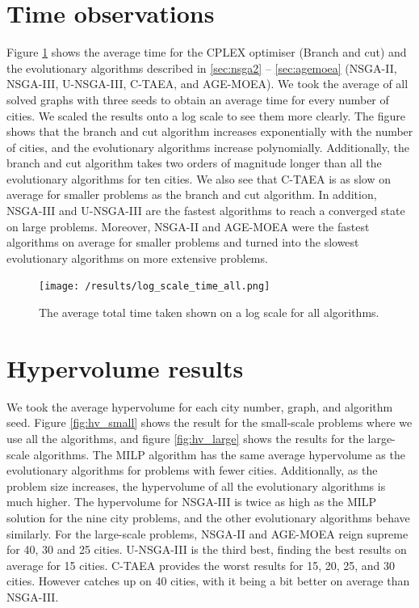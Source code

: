 \documentclass[mscthesis, 11pt]{usiinfthesis}
\theoremstyle{newdefinition}
\begin{document}
\section{Time observations}\label{sec:time_res}
Figure \ref{fig:log_time} shows the average time for the CPLEX optimiser (Branch and cut) and the evolutionary algorithms described in \ref{sec:nsga2} -- \ref{sec:agemoea} (NSGA-II, NSGA-III, U-NSGA-III, C-TAEA, and AGE-MOEA). We took the average of all solved graphs with three seeds to obtain an average time for every number of cities. We scaled the results onto a log scale to see them more clearly. The figure shows that the branch and cut algorithm increases exponentially with the number of cities, and the evolutionary algorithms increase polynomially. Additionally, the branch and cut algorithm takes two orders of magnitude longer than all the evolutionary algorithms for ten cities.  We also see that C-TAEA is as slow on average for smaller problems as the branch and cut algorithm. In addition, NSGA-III and U-NSGA-III are the fastest algorithms to reach a converged state on large problems. Moreover, NSGA-II and AGE-MOEA were the fastest algorithms on average for smaller problems and turned into the slowest evolutionary algorithms on more extensive problems.
\begin{figure}[ht]
    \centering
    \texttt{[image: /results/log\_scale\_time\_all.png]}
    \caption{The average total time taken shown on a log scale for all algorithms.}
    \label{fig:log_time}
\end{figure}
\clearpage
\section{Hypervolume results}\label{sec:hv_res}
We took the average hypervolume for each city number, graph, and algorithm seed. Figure \ref{fig:hv_small} shows the result for the small-scale problems where we use all the algorithms, and figure \ref{fig:hv_large} shows the results for the large-scale algorithms. The MILP algorithm has the same average hypervolume as the evolutionary algorithms for problems with fewer cities. Additionally, as the problem size increases, the hypervolume of all the evolutionary algorithms is much higher. The hypervolume for NSGA-III is twice as high as the MILP solution for the nine city problems, and the other evolutionary algorithms behave similarly. For the large-scale problems, NSGA-II and AGE-MOEA reign supreme for 40, 30 and 25 cities. U-NSGA-III is the third best, finding the best results on average for 15 cities. C-TAEA provides the worst results for 15, 20, 25, and 30 cities. However catches up on 40 cities, with it being a bit better on average than NSGA-III.
\end{document}
